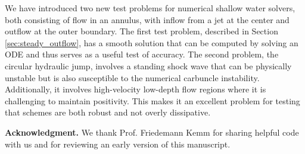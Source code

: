 \documentclass[preprint, 11pt]{article}
\begin{document}
We have introduced two new test problems for numerical shallow water solvers,
both consisting of flow in an annulus, with inflow from a jet
at the center and outflow at the outer boundary.  The first test
problem, described in Section \ref{sec:steady_outflow}, has a smooth solution that can
be computed by solving an ODE and thus serves as a useful test of
accuracy.  The second problem, the circular hydraulic jump, involves
a standing shock wave that can be physically unstable but is
also susceptible to the numerical carbuncle instability.
Additionally, it involves high-velocity low-depth flow regions where
it is challenging to maintain positivity.
This makes it an excellent problem for testing that schemes are both
robust and not overly dissipative.


{\bf Acknowledgment.}  We thank Prof. Friedemann Kemm for sharing helpful code
with us and for reviewing an early version of this manuscript.
%


\end{document}
